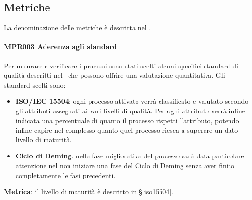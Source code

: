 	\subsection{Metriche}
	La denominazione delle metriche è descritta nel \NdPd.
	
		\paragraph{MPR003 Aderenza agli standard}
		Per misurare e verificare i processi sono stati scelti alcuni specifici standard di qualità descritti nel \PdQ\ che possono offrire una valutazione quantitativa.
		Gli standard scelti sono:
		
		\begin{itemize}
			\item \textbf{ISO/IEC 15504}: ogni processo attivato verrà classificato e valutato secondo gli attributi assegnati ai vari livelli di qualità. Per ogni attributo verrà infine indicata una percentuale di quanto il processo rispetti l'attributo, potendo infine capire nel complesso quanto quel processo riesca a superare un dato livello di maturità.
			\item \textbf{Ciclo di Deming}: nella fase migliorativa del processo sarà data particolare attenzione nel non iniziare una fase del Ciclo di Deming senza aver finito completamente le fasi precedenti.
		\end{itemize}
		
		\textbf{Metrica}: il livello di maturità è descritto in \S\ref{iso15504}.
